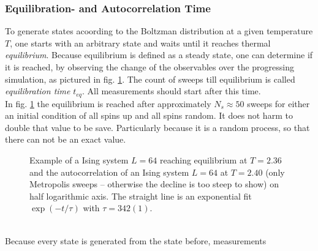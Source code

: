     \subsubsection{Equilibration- and Autocorrelation Time}
    \label{sssec:eqtime}
        To generate states acoording to the Boltzman distribution at a
        given temperature \(T\), one starts with an arbitrary state
        and waits until it reaches thermal \emph{equilibrium}. Because
        equilibrium is defined as a steady state, one can determine if it
        is reached, by observing the change of the observables over the
        progressing simulation, as pictured in fig. \ref{fig:equiandauto}.
        The count of sweeps till
        equilibrium is called \emph{equilibration time} \(t_{eq}\).
        All measurements should start after this time.\\
        In fig. \ref{fig:equiandauto}
        the equilibrium is reached after approximately \(N_{s} \approx 50\) sweeps for
        either an initial condition of all spins up and all spins random. It
        does not harm to double that value to be save. Particularly because
        it is a random process, so that there can not be an exact value.
        \begin{figure}[htbp]
            \centering
            \caption[Examples for Equilibration and Autocorrelation]
            {
                 Example of a Ising system
                    \(L=64\) reaching equilibrium at \(T=2.36\) and
                 the autocorrelation of an
                    Ising system \(L=64\) at \(T=2.40\) (only Metropolis
                    sweeps -- otherwise the decline is too steep to show)
                    on half logarithmic axis.
                    The straight line is an exponential fit \(\exp(-t/\tau)\)
                    with \(\tau = 342(1)\).
            }
            \label{fig:equiandauto}
        \end{figure}\\
        Because every state is generated from the state before, measurements

